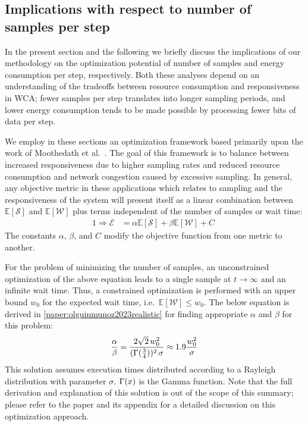 \subsection{Implications with respect to number of samples per step}

In the present section and the following we briefly discuss the implications of our methodology on the optimization potential of number of samples and energy consumption per step, respectively.
Both these analyses depend on an understanding of the tradeoffs between resource consumption and responsiveness in \gls{WCA};
fewer samples per step translates into longer sampling periods, and lower energy consumption tends to be made possible by processing fewer bits of data per step.

We employ in these sections an optimization framework based primarily upon the work of Moothedath et al.~\cite{moothedath2021energy,moothedath2022energy1,moothedath2022energy2}.
The goal of this framework is to balance between increased responsiveness due to higher sampling rates and reduced resource consumption and network congestion caused by excessive sampling.
In general, any objective metric in these applications which relates to sampling and the responsiveness of the system will present itself
as a linear combination between \ensuremath{\mathbb{E}[\mathcal{S}]} and \ensuremath{\mathbb{E}[\mathcal{W}]} plus terms independent of the number of samples or wait time:
\begin{alignat}{1}\label{eq:tradeoff}
    \Rightarrow\mathcal{E}&=\alpha\mathbb{E}[\mathcal{S}]+\beta\mathbb{E}[\mathcal{W}]+C\;
\end{alignat}
The constants \ensuremath{\alpha}, \ensuremath{\beta}, and \ensuremath{C} modify the objective function from one metric to another.

\medskip
For the problem of minimizing the number of samples, an unconstrained optimization of the above equation leads to a single sample at \ensuremath{t \rightarrow \infty} and an infinite wait time.
Thus, a constrained optimization is performed with an upper bound \ensuremath{w_0} for the expected wait time, i.e.\ \ensuremath{\mathbb{E}[\mathcal{W}] \leq w_0}.
The below equation is derived in \cref{paper:olguinmunoz2023realistic} for finding appropriate \ensuremath{\alpha} and \ensuremath{\beta} for this problem:
\begin{alignat}{1}\label{eq:sampling}
\frac{\alpha}{\beta}=\frac{2\sqrt{2}\,w_0^2}{(\mathlarger{\Gamma}(\tfrac{3}{4}))^2\,\sigma}\approx1.9\frac{w_0^2}{\sigma}
\end{alignat}
This solution assumes execution times distributed according to a Rayleigh distribution with parameter \ensuremath{\sigma}.
\ensuremath{\mathlarger{\Gamma}(x)} is the Gamma function.
Note that the full derivation and explanation of this solution is out of the scope of this summary;
please refer to the paper and its appendix for a detailed discussion on this optimization approach.

